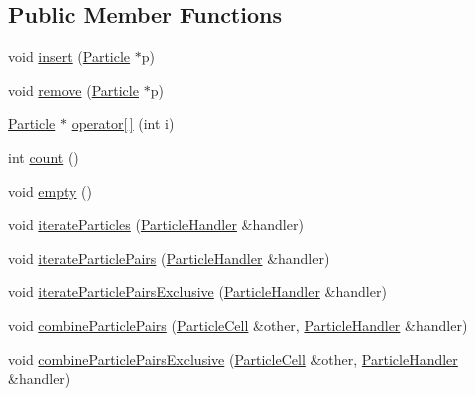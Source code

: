 \subsection*{Public Member Functions}
\begin{DoxyCompactItemize}
\item 
void \hyperlink{classSimulation_1_1ParticleContainer_1_1ParticleCell_a6e23daa21b4a6ff7d88dd4bc8f22ff8b}{insert} (\hyperlink{classSimulation_1_1Particle}{Particle} $\ast$p)
\item 
void \hyperlink{classSimulation_1_1ParticleContainer_1_1ParticleCell_a14d1bf2b7b613d94f01ef5f54d16a4f2}{remove} (\hyperlink{classSimulation_1_1Particle}{Particle} $\ast$p)
\item 
\hyperlink{classSimulation_1_1Particle}{Particle} $\ast$ \hyperlink{classSimulation_1_1ParticleContainer_1_1ParticleCell_a601627c38a7b73b91727dc8409b7f951}{operator\mbox{[}$\,$\mbox{]}} (int i)
\item 
int \hyperlink{classSimulation_1_1ParticleContainer_1_1ParticleCell_a7e1b285d4c96a14bd1ace77114714630}{count} ()
\item 
void \hyperlink{classSimulation_1_1ParticleContainer_1_1ParticleCell_af31f427d33ccc9186e5a48ee852e6957}{empty} ()
\item 
void \hyperlink{classSimulation_1_1ParticleContainer_1_1ParticleCell_a051c06f107fa079acfbdd25ec26fa5db}{iterate\-Particles} (\hyperlink{classSimulation_1_1ParticleHandler}{Particle\-Handler} \&handler)
\item 
void \hyperlink{classSimulation_1_1ParticleContainer_1_1ParticleCell_aac30d823530dad6b959421e8370ef376}{iterate\-Particle\-Pairs} (\hyperlink{classSimulation_1_1ParticleHandler}{Particle\-Handler} \&handler)
\item 
void \hyperlink{classSimulation_1_1ParticleContainer_1_1ParticleCell_a173182caabbd931a12a58b450c11ea4d}{iterate\-Particle\-Pairs\-Exclusive} (\hyperlink{classSimulation_1_1ParticleHandler}{Particle\-Handler} \&handler)
\item 
void \hyperlink{classSimulation_1_1ParticleContainer_1_1ParticleCell_a38f5e6f69ff7c87fbf598977f4fc1071}{combine\-Particle\-Pairs} (\hyperlink{classSimulation_1_1ParticleContainer_1_1ParticleCell}{Particle\-Cell} \&other, \hyperlink{classSimulation_1_1ParticleHandler}{Particle\-Handler} \&handler)
\item 
void \hyperlink{classSimulation_1_1ParticleContainer_1_1ParticleCell_aa4726b1a94a339dc0a9c15bacdc4296a}{combine\-Particle\-Pairs\-Exclusive} (\hyperlink{classSimulation_1_1ParticleContainer_1_1ParticleCell}{Particle\-Cell} \&other, \hyperlink{classSimulation_1_1ParticleHandler}{Particle\-Handler} \&handler)
\end{DoxyCompactItemize}
